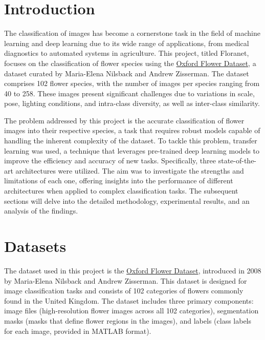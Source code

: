 \section{Introduction}
The classification of images has become a cornerstone task in the field of machine learning and deep learning due to
its wide range of applications, from medical diagnostics to automated systems in agriculture. This project, titled
Floranet, focuses on the classification of flower species using the \href{https://www.robots.ox.ac.uk/~vgg/data/flowers/102/index.html}{Oxford Flower Dataset},
a dataset curated by Maria-Elena Nilsback and Andrew Zisserman. The dataset comprises 102 flower species, with the
number of images per species ranging from 40 to 258. These images present significant challenges due to variations in
scale, pose, lighting conditions, and intra-class diversity, as well as inter-class similarity.

\vspace{0.3cm}

The problem addressed by this project is the accurate classification of flower images into their respective species,
a task that requires robust models capable of handling the inherent complexity of the dataset. To tackle this problem,
transfer learning was used, a technique that leverages pre-trained deep learning models to improve the efficiency and
accuracy of new tasks. Specifically, three state-of-the-art architectures were utilized. The aim was to investigate the
strengths and limitations of each one, offering insights into the performance of different architectures when applied
to complex classification tasks. The subsequent sections will delve into the detailed methodology, experimental
results, and an analysis of the findings.


\section{Datasets}
The dataset used in this project is the \href{https://www.robots.ox.ac.uk/~vgg/data/flowers/102/index.html}{Oxford Flower Dataset},
introduced in 2008 by Maria-Elena Nilsback and Andrew Zisserman. This dataset is designed for image classification tasks
and consists of 102 categories of flowers commonly found in the United Kingdom. The dataset includes three primary components:
image files (high-resolution flower images across all 102 categories), segmentation masks (masks that define flower regions
in the images), and labels (class labels for each image, provided in MATLAB format).

